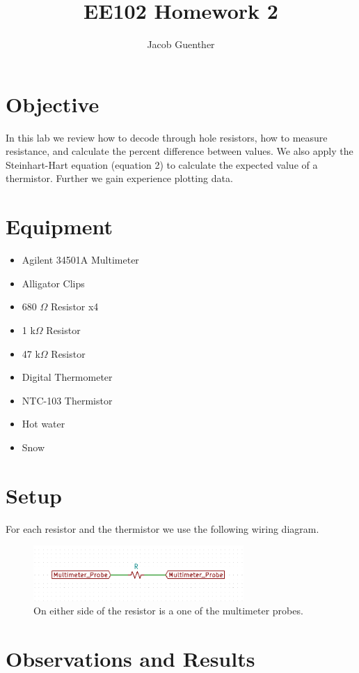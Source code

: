 \documentclass{article}
\title{EE102 Homework 2}
\author{Jacob Guenther}
\begin{document}


\section{Objective}
In this lab we review how to decode through hole resistors, how to measure resistance, and calculate the percent difference between values. We also apply the Steinhart-Hart equation (equation 2) to calculate the expected value of a thermistor. Further we gain experience plotting data.

\section{Equipment}
\begin{itemize}
	\item Agilent 34501A Multimeter
	\item Alligator Clips
	\item 680 $\Omega$ Resistor x4
	\item 1 k$\Omega$ Resistor
	\item 47 k$\Omega$ Resistor
	\item Digital Thermometer
	\item NTC-103 Thermistor
	\item Hot water
	\item Snow
\end{itemize}

\section{Setup}
For each resistor and the thermistor we use the following wiring diagram.

\begin{figure}[H]
	\begin{center}
		\includegraphics[width=8cm]{lab_1_figure_1}
	\end{center}
	\caption{On either side of the resistor is a one of the multimeter probes.}
\end{figure}

\section{Observations and Results}
\end{document}
